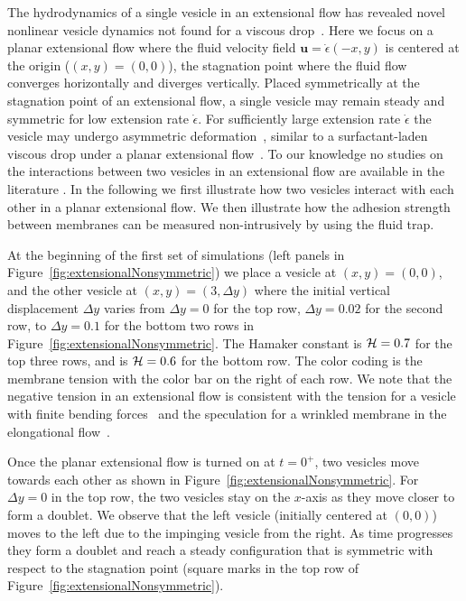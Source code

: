 \documentclass[prf,superscriptaddress,showkeys,longbibliography]{revtex4-1}
\newcommand{\uu}{\mathbf{u}}
\begin{document}
The hydrodynamics of a single vesicle in an extensional flow has
revealed novel nonlinear vesicle dynamics not found for a viscous
drop~\cite{KantslerSegreSteinberg2008_PRL, ZhaoShaqfeh2013_JFM,
Narsimhan2014_JFM, DahlNarsimhanGouveia2016_SoftMatt}.  Here we focus on
a planar extensional flow  where the fluid velocity field
$\uu=\dot\epsilon(-x,y)$ is centered at the origin ($(x,y)=(0,0)$), the
stagnation point where the fluid flow converges horizontally and
diverges vertically.  Placed symmetrically at the stagnation point of an
extensional flow, a single vesicle may remain steady and symmetric for
low extension rate $\dot\epsilon$.  For sufficiently large extension
rate $\dot\epsilon$ the vesicle may undergo asymmetric
deformation~\cite{KantslerSegreSteinberg2008_PRL,Narsimhan2014_JFM,DahlNarsimhanGouveia2016_SoftMatt},
similar to a surfactant-laden viscous drop under a planar extensional
flow~\cite{JanssenBoonAgterof1997_AIChE,HuPineLeal2000_PoF}.  To our
knowledge no studies on the interactions between two vesicles in an
extensional flow are available in the literature .  In the following we first illustrate how
two vesicles interact with each other in a planar extensional flow. We
then illustrate how the adhesion strength between membranes can be
measured non-intrusively by using the fluid trap.

At the beginning of the first set of simulations (left panels in
Figure~\ref{fig:extensionalNonsymmetric}) we place a vesicle at
$(x,y)=(0,0)$, and the other vesicle at $(x,y) = (3,\Delta y)$ where
the initial vertical displacement $\Delta y$ varies from $\Delta
y=0$ for the top row, $\Delta y = 0.02$ for the second row, to
$\Delta y =0.1$ for the bottom two rows in
Figure~\ref{fig:extensionalNonsymmetric}.  The Hamaker constant is ${\cal
H} = 0.7$ for the top three rows, and is ${\cal H} =0.6$ for the bottom
row.  The color coding is the membrane tension with the color bar on the
right of each row. We note that the negative tension in an extensional
flow is consistent with the tension for a vesicle with finite bending
forces~\cite{Narsimhan2014_JFM} and the speculation for a wrinkled
membrane in the elongational flow~\cite{KantslerSegreSteinberg2007_PRL}.

Once the planar extensional flow is turned on at $t=0^+$, two vesicles
move towards each other as shown in
Figure~\ref{fig:extensionalNonsymmetric}.  For $\Delta y=0$ in the top
row, the two vesicles stay on the $x$-axis as they move closer to form a
doublet.  We observe that the left vesicle (initially centered at
$(0,0)$) moves to the left due to the impinging vesicle from the right.
As time progresses they form a doublet and reach a steady configuration
that is symmetric with respect to the stagnation point (square marks in
the top row of Figure~\ref{fig:extensionalNonsymmetric}).
\end{document}
